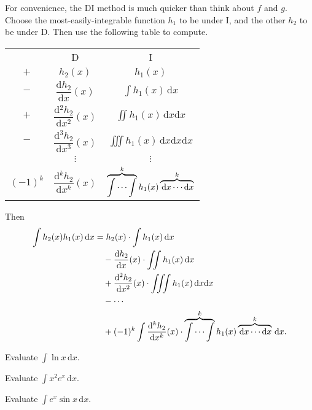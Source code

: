 \documentclass[11pt]{article}
\theoremstyle{break}
\theoremstyle{no_label}
\newcommand{\derivative}[2]{\dfrac{\dd{#1}}{\dd{#2}}}
\newcommand{\dd}{\text{d}}
\newcommand{\ddi}{\text{$\,$d}}
\numberwithin{equation}{theorem}
\begin{document}
\begin{remark}[DI Method]
    For convenience, the DI method is much quicker than think about $f$ and $g$. Choose the most-easily-integrable function $h_1$ to be under I, and the other $h_2$ to be under D. Then use the following table to compute.
    
    \begin{center}
        \begin{tabular}{c c c}
            & D & I \\
            $+$ & $h_2(x)$ & $h_1(x)$ \\
            $-$ & $\derivative{h_2}{x}(x)$ & $\displaystyle\int h_1(x)\ddi x$ \\
            $+$ & $\derivative{^2h_2}{x^2}(x)$ & $\displaystyle\iint h_1(x)\ddi x\dd x$ \\
            $-$ & $\derivative{^3h_2}{x^3}(x)$ & $\displaystyle\iiint h_1(x)\ddi x\dd x\dd x$ \\
            & $\vdots$ & $\vdots$ \\
            $(-1)^{k}$ & $\derivative{^kh_2}{x^k}(x)$ & $\displaystyle\overbrace{\idotsint}^k h_1(x)\overbrace{\ddi x\cdots\dd x}^k$ \\
        \end{tabular}
    \end{center}
    Then \begin{align*}
        \int h_2(x)h_1(x)\ddi x&=h_2(x)\cdot\int h_1(x)\ddi x\\
        &\quad-\derivative{h_2}{x}(x)\cdot\iint h_1(x)\ddi x\\
        &\quad+\derivative{^2h_2}{x^2}(x)\cdot\iiint h_1(x)\ddi x\dd x\\
        &\quad-\cdots\\
        &\quad+(-1)^k\int\derivative{^kh_2}{x^k}(x)\cdot\overbrace{\idotsint}^k h_1(x)\overbrace{\ddi x\cdots\dd x}^k\ddi x.
    \end{align*}
\end{remark}

\begin{example}
    Evaluate $\displaystyle\int\ln x\ddi x$.
\end{example}
\vspace{15em}

\begin{example}
    Evaluate $\displaystyle\int x^2e^x\ddi x$.
\end{example}
\vspace{15em}

\begin{example}
    Evaluate $\displaystyle\int e^x\sin x\ddi x$.
\end{example}
\vspace{15em}
\end{document}
